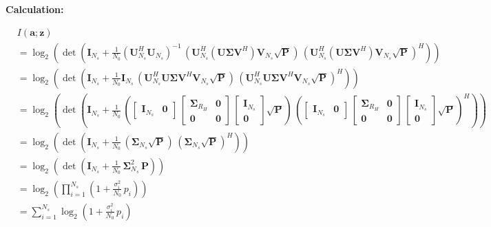 \textbf{Calculation:}
\begin{fleqn}[1.5em]
\begin{subequations}
\begin{align*}
    &I(\mathbf{a}; \mathbf{z}) \\
    &= \log_2\!\left(\det\!\left(\mathbf{I}_{N_s} + \tfrac{1}{N_0} (\mathbf{U}_{N_s}^H \mathbf{U}_{N_s})^{-1} \, (\mathbf{U}_{N_s}^H (\mathbf{U} \mathbf{\Sigma} \mathbf{V}^H) \mathbf{V}_{N_s} \sqrt{\mathbf{P}}) \, (\mathbf{U}_{N_s}^H (\mathbf{U} \mathbf{\Sigma} \mathbf{V}^H) \mathbf{V}_{N_s} \sqrt{\mathbf{P}})^H\right)\right) \\
    &= \log_2\!\left(\det\!\left(\mathbf{I}_{N_s} + \tfrac{1}{N_0} \mathbf{I}_{N_s} \, (\mathbf{U}_{N_s}^H \mathbf{U} \mathbf{\Sigma} \mathbf{V}^H \mathbf{V}_{N_s} \sqrt{\mathbf{P}}) \, (\mathbf{U}_{N_s}^H \mathbf{U} \mathbf{\Sigma} \mathbf{V}^H \mathbf{V}_{N_s} \sqrt{\mathbf{P}})^H\right)\right) \\
    &= \log_2\!\left(\det\!\left(\mathbf{I}_{N_s} + \tfrac{1}{N_0} \, \left(\begin{bmatrix} \mathbf{I}_{N_s} & \mathbf{0} \end{bmatrix} \, \begin{bmatrix} \mathbf{\Sigma}_{R_H} & \mathbf{0} \\ \mathbf{0} & \mathbf{0} \end{bmatrix} \, \begin{bmatrix} \mathbf{I}_{N_s} \\ \mathbf{0} \end{bmatrix} \sqrt{\mathbf{P}}\right) \, \left(\begin{bmatrix} \mathbf{I}_{N_s} & \mathbf{0} \end{bmatrix} \, \begin{bmatrix} \mathbf{\Sigma}_{R_H} & \mathbf{0} \\ \mathbf{0} & \mathbf{0} \end{bmatrix} \, \begin{bmatrix} \mathbf{I}_{N_s} \\ \mathbf{0} \end{bmatrix} \sqrt{\mathbf{P}}\right)^H\right)\right)  \\
    &= \log_2\!\left(\det\!\left(\mathbf{I}_{N_s} + \tfrac{1}{N_0} \, (\mathbf{\Sigma}_{N_s} \sqrt{\mathbf{P}}) \, (\mathbf{\Sigma}_{N_s} \sqrt{\mathbf{P}})^H\right)\right) \\
    &= \log_2\!\left(\det\!\left(\mathbf{I}_{N_s} + \tfrac{1}{N_0} \, \mathbf{\Sigma}_{N_s}^2 \, \mathbf{P}\right)\right) \\
    &= \log_2\!\left( \prod_{i=1}^{N_s} \left(1 + \frac{\sigma^2_i}{N_0}\, p_i \right) \right)  \\
    &= \sum_{i=1}^{N_s} \log_2\!\left(1 + \frac{\sigma^2_i}{N_0}\, p_i \right) \\
\end{align*}
\end{subequations}
\end{fleqn}
